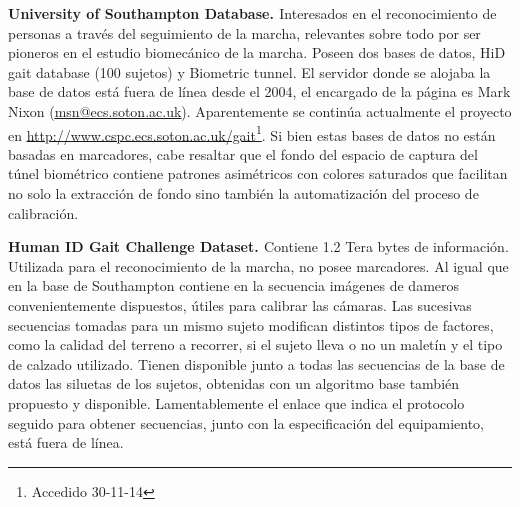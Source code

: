 \textbf{University of Southampton Database. \cite{US}}
Interesados en el reconocimiento de personas a través del seguimiento de la marcha, relevantes sobre todo por ser pioneros en el estudio biomecánico de la marcha. Poseen dos bases de datos, HiD gait database  (100 sujetos) y Biometric tunnel. El servidor donde se alojaba la base de datos está fuera de línea desde el 2004, el encargado de la página es Mark Nixon (\textcolor{blue}{\underline{\url{msn@ecs.soton.ac.uk}}}). Aparentemente se continúa actualmente el proyecto en \textcolor{blue}{\underline{\url{http://www.cspc.ecs.soton.ac.uk/gait}}}\footnote{Accedido 30-11-14}. Si bien estas bases de datos no están basadas en marcadores, cabe resaltar que el fondo del espacio de captura del túnel biométrico contiene patrones asimétricos con colores saturados que facilitan no solo la extracción de fondo sino también la automatización del proceso de calibración.

\textbf{Human ID Gait Challenge Dataset. \cite{Human_ID}}
Contiene 1.2 Tera bytes de información. Utilizada para el reconocimiento de la marcha,  no posee marcadores. Al igual que en la base de Southampton contiene en la secuencia imágenes de dameros convenientemente dispuestos, útiles para calibrar las cámaras. Las sucesivas secuencias tomadas para un mismo sujeto modifican distintos tipos de factores, como la calidad del terreno a recorrer, si el sujeto lleva o no un maletín y el  tipo de calzado utilizado. Tienen disponible junto a todas las secuencias de la base de datos las siluetas de los sujetos, obtenidas con un algoritmo base también propuesto y disponible. Lamentablemente el enlace que indica el protocolo seguido para obtener secuencias, junto con la especificación del equipamiento, está fuera de línea.

